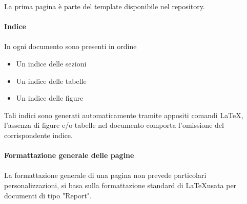 \documentclass[a4paper]{report}
\begin{document}
					La prima pagina è parte del template disponibile nel repository. \\ \\
				\textbf{Indice} \\ \\
					In ogni documento sono presenti in ordine
					\begin{itemize}
						\item Un indice delle sezioni
						\item Un indice delle tabelle
						\item Un indice delle figure
					\end{itemize}
					Tali indici sono generati automaticamente tramite appositi comandi \LaTeX, l'assenza di figure 
					e/o tabelle nel documento comporta l'omissione del corrispondente indice. \\ \\
				\textbf{Formattazione generale delle pagine} \\ \\
					La formattazione generale di una pagina non prevede particolari personalizzazioni, si basa 
					sulla formattazione standard di \LaTeX \space usata per documenti di tipo "Report". 
\end{document}
